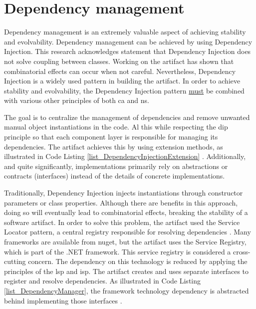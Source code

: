 \section{Dependency management} Dependency management is an extremely valuable aspect of
achieving stability and evolvability. Dependency management can be achieved by using
Dependency Injection. This research acknowledges \textcite[215]{mannaert_normalized_2016}
statement that Dependency Injection does not solve coupling between classes. Working on
the artifact has shown that combinatorial effects can occur when not careful.
Nevertheless, Dependency Injection is a widely used pattern in building the artifact. In
order to achieve stability and evolvability, the Dependency Injection pattern
\underline{must} be combined with various other principles of both \gls{ca} and \gls{ns}. 

The goal is to centralize the management of dependencies and remove unwanted manual object
instantiations in the code. Al this while respecting the \gls{dip} principle so that each
component layer is responsible for managing its dependencies. The artifact achieves this
by using extension methods, as illustrated in Code Listing
\ref{list_DependencyInjectionExtension}
\parencite{koks_dependencyinjectionextension_2023}. Additionally, and quite significantly,
implementations primarily rely on abstractions or contracts (interfaces) instead of the
details of concrete implementations. 

Traditionally, Dependency Injection injects instantiations through constructor parameters
or class properties. Although there are benefits in this approach, doing so will
eventually lead to combinatorial effects, breaking the stability of a software artifact.
In order to solve this problem, the artifact used the Service Locator pattern, a central
registry responsible for resolving dependencies \parencite{wikipedia_service_2023}. Many
frameworks are available from \gls{nuget}, but the artifact uses the Service Registry,
which is part of the .NET framework. This service registry is considered a cross-cutting
concern. The dependency on this technology is reduced by applying the principles of the
\gls{lsp} and \gls{isp}. The artifact creates and uses separate interfaces to register
\parencite{koks_idependencymanagerinteractor_2023} and resolve
\parencite{koks_idependencyfactoryinteractor_2023} dependencies. As illustrated in Code
Listing \ref{list_DependencyManager}, the framework technology dependency is abstracted
behind implementing those interfaces \parencite{koks_dependencymanagerinteractor_2023}. 


